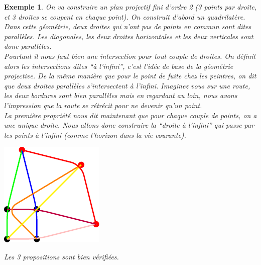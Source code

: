 \documentclass[a4paper]{article}
\newtheorem{Ex}{Exemple}[subsection]
\begin{document}
\begin{Ex}
  On va construire un plan projectif fini d'ordre 2 (3 points par droite, et 3 droites se coupent en chaque point). On construit d'abord un quadrilatère. Dans cette géométrie, deux droites qui n'ont pas de points en commun sont dites parallèles. Les diagonales, les deux droites horizontales et les deux verticales \vspace{1\baselineskip}sont donc parallèles.\\
  Pourtant il nous faut bien une intersection pour tout couple de droites. On définit alors les intersections dites ``à l'infini'', c'est l'idée de base de la géométrie projective. De la même manière que pour le point de fuite chez les peintres, on dit que deux droites parallèles s'intersectent à l'infini. Imaginez vous sur une route, les deux bordures sont bien parallèles mais en regardant au loin, nous avons l'impression que la route se rétrécit pour ne devenir\vspace{1\baselineskip} qu'un point.\\
La première propriété nous dit maintenant que pour chaque couple de points, on a une unique droite. Nous allons donc construire la ``droite à l'infini'' qui passe par les points à l'infini (comme l'horizon dans la vie courante).
\begin{center}
\includegraphics[scale=1.5]{test_tikz.pdf}
\end{center}
\vspace{2\baselineskip}
Les 3 propositions sont bien vérifiées.
\end{Ex}
\newpage
\end{document}
